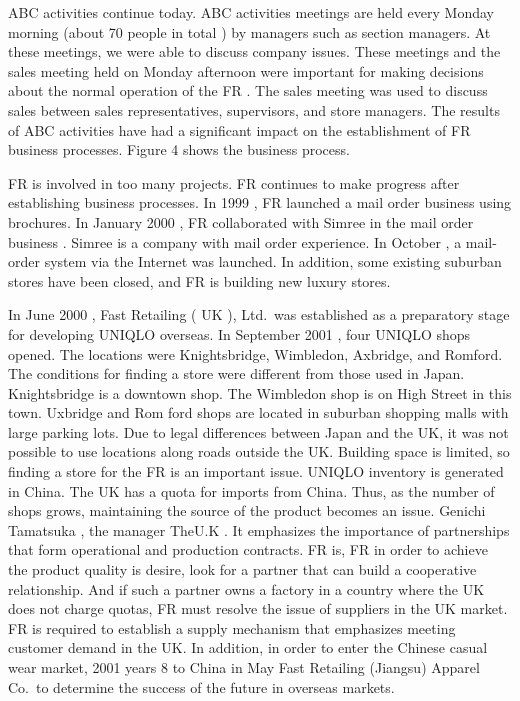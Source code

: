 \documentclass[]{article}
\begin{document}
ABC activities continue today. ABC activities meetings are held every
Monday morning (about 70 people in total ) by managers such as section
managers. At these meetings, we were able to discuss company issues.
These meetings and the sales meeting held on Monday afternoon were
important for making decisions about the normal operation of the FR .
The sales meeting was used to discuss sales between sales
representatives, supervisors, and store managers. The results of ABC
activities have had a significant impact on the establishment of FR
business processes. Figure 4 shows the business process.

FR is involved in too many projects. FR continues to make progress after
establishing business processes. In 1999 , FR launched a mail order
business using brochures. In January 2000 , FR collaborated with Simree
in the mail order business . Simree is a company with mail order
experience. In October , a mail-order system via the Internet was
launched. In addition, some existing suburban stores have been closed,
and FR is building new luxury stores.

In June 2000 , Fast Retailing ( UK ), Ltd.~was established as a
preparatory stage for developing UNIQLO overseas. In September 2001 ,
four UNIQLO shops opened. The locations were Knightsbridge, Wimbledon,
Axbridge, and Romford. The conditions for finding a store were different
from those used in Japan. Knightsbridge is a downtown shop. The
Wimbledon shop is on High Street in this town. Uxbridge and Rom ford
shops are located in suburban shopping malls with large parking lots.
Due to legal differences between Japan and the UK, it was not possible
to use locations along roads outside the UK. Building space is limited,
so finding a store for the FR is an important issue. UNIQLO inventory is
generated in China. The UK has a quota for imports from China. Thus, as
the number of shops grows, maintaining the source of the product becomes
an issue. Genichi Tamatsuka , the manager TheU.K . It emphasizes the
importance of partnerships that form operational and production
contracts. FR is, FR in order to achieve the product quality is desire,
look for a partner that can build a cooperative relationship. And if
such a partner owns a factory in a country where the UK does not charge
quotas, FR must resolve the issue of suppliers in the UK market. FR is
required to establish a supply mechanism that emphasizes meeting
customer demand in the UK. In addition, in order to enter the Chinese
casual wear market, 2001 years 8 to China in May Fast Retailing
(Jiangsu) Apparel Co.~to determine the success of the future in overseas
markets.
\end{document}
